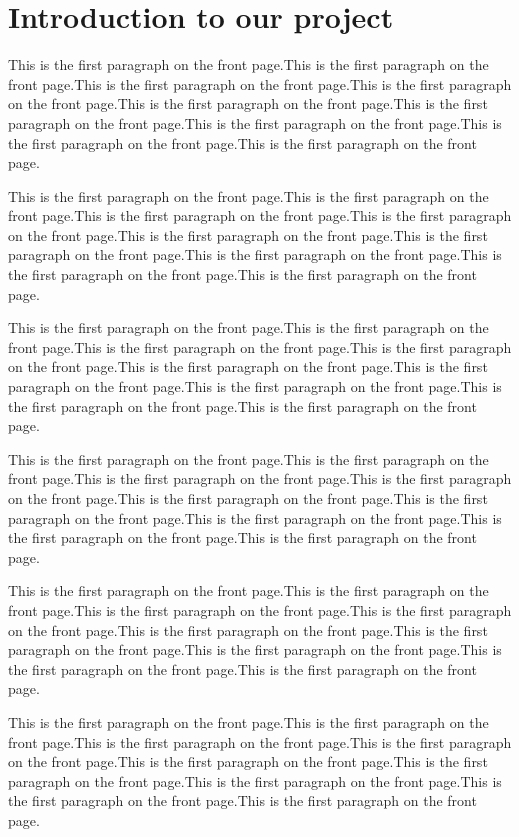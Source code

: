 \documentclass{article}
\begin{document}
\tableofcontents

\newpage
\section{Introduction to our project}
This is the first paragraph on the front page.This is the first paragraph on the front page.This is the first paragraph on the front page.This is the first paragraph on the front page.This is the first paragraph on the front page.This is the first paragraph on the front page.This is the first paragraph on the front page.This is the first paragraph on the front page.This is the first paragraph on the front page.\par
This is the first paragraph on the front page.This is the first paragraph on the front page.This is the first paragraph on the front page.This is the first paragraph on the front page.This is the first paragraph on the front page.This is the first paragraph on the front page.This is the first paragraph on the front page.This is the first paragraph on the front page.This is the first paragraph on the front page.\par
This is the first paragraph on the front page.This is the first paragraph on the front page.This is the first paragraph on the front page.This is the first paragraph on the front page.This is the first paragraph on the front page.This is the first paragraph on the front page.This is the first paragraph on the front page.This is the first paragraph on the front page.This is the first paragraph on the front page.\par
This is the first paragraph on the front page.This is the first paragraph on the front page.This is the first paragraph on the front page.This is the first paragraph on the front page.This is the first paragraph on the front page.This is the first paragraph on the front page.This is the first paragraph on the front page.This is the first paragraph on the front page.This is the first paragraph on the front page.\par
This is the first paragraph on the front page.This is the first paragraph on the front page.This is the first paragraph on the front page.This is the first paragraph on the front page.This is the first paragraph on the front page.This is the first paragraph on the front page.This is the first paragraph on the front page.This is the first paragraph on the front page.This is the first paragraph on the front page.\par
This is the first paragraph on the front page.This is the first paragraph on the front page.This is the first paragraph on the front page.This is the first paragraph on the front page.This is the first paragraph on the front page.This is the first paragraph on the front page.This is the first paragraph on the front page.This is the first paragraph on the front page.This is the first paragraph on the front page.\par
\end{document}
